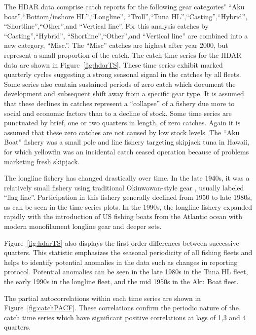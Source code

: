 \documentclass[12pt,letterpaper]{article}
\newcommand\help[1]{\color{Magenta}{\it #1 }\normalcolor}
\begin{document}
The HDAR data comprise catch reports for the following gear
categories"
``Aku boat'',``Bottom/inshore HL'',``Longline'',
``Troll'',``Tuna HL'',``Casting'',``Hybrid'',
``Shortline'',``Other'',and ``Vertical line''.
For this analysis catches by ``Casting'',``Hybrid'',
``Shortline'',``Other'',and ``Vertical line'' are combined into a new
category, ``Misc.''. The ``Misc'' catches are highest after year 2000,
but represent a small proportion of the catch.
The catch time series for the HDAR data are shown in
Figure~\ref{fig:hdarTS}. These time
series exhibit marked quarterly cycles suggesting a strong seasonal
signal in the catches by all fleets.
Some series also contain sustained periods of zero catch which
document the development and subsequent shift away from a specific
gear type. It is assumed that these declines in catches represent a
``collapse'' of a fishery due more to social and economic factors than
to a decline of stock.
Some time series are punctuated by brief, one or two quarters in
length, of zero catches. Again it is assumed that these zero catches
are not caused by low stock levels.
The ``Aku Boat'' fishery was a small pole and line fishery
targeting skipjack tuna in Hawaii, for which yellowfin was an
incidental catch ceased operation because of
problems marketing fresh skipjack.

The longline fishery has changed drastically over time. In the late
1940s, it was a relatively small fishery using traditional
Okinwawan-style gear \help{(reference)}, usually labeled ``flag
line''. Participation in this fishery generally declined from 1950 to
late 1980s, as can be seen in the time series plots. In the 1990s, the longline
fishery expanded rapidly with the introduction of US fishing boats
from the Atlantic ocean with modern monofilament longline gear and
deeper sets.

Figure~\ref{fig:hdarTS} also displays the first order differences
between successive quarters. This statistic emphasizes the seasonal
periodicity of all fishing fleets and helps to identify potential anomalies in
the data such as changes in reporting protocol. Potential
anomalies can be seen in the late 1980s in the Tuna HL fleet, the
early 1990s in the longline fleet, and the mid 1950s in the Aku Boat
fleet. 

The partial autocorrelations within each time
series are shown in Figure~\ref{fig:catchPACF}. These correlations
confirm the periodic nature of the catch time series which have
significant positive correlations at lags of 1,3 and 4 quarters.
\end{document}
